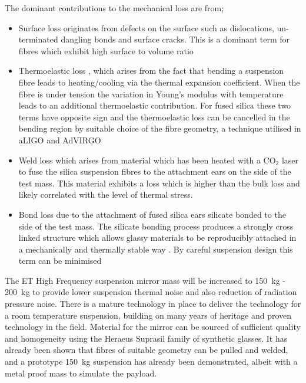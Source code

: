 The dominant contributions to the mechanical loss are from;
\begin{itemize}
\item Surface loss \cite{Gretarsson:1999, Penn:2006} originates from defects on the surface such as dislocations, un-terminated dangling bonds and surface cracks. This is a dominant term for fibres which exhibit high surface to volume ratio
\item Thermoelastic loss \cite{Cagnoli:2002}, which arises from the fact that bending a suspension fibre leads to heating/cooling via the thermal expansion coefficient. When the fibre is under tension the variation in Young's modulus with temperature leads to an additional thermoelastic contribution. For fused silica these two terms have opposite sign and the thermoelastic loss can be cancelled in the bending region by suitable choice of the fibre geometry, a technique utilised in aLIGO and AdVIRGO \cite{Bell:2013}
\item Weld loss which arises from material which has been heated with a $\textrm{CO}_{2}$ laser \cite{Cumming:2012} to fuse the silica suspension fibres to the attachment ears on the side of the test mass. This material exhibits a loss which is higher than the bulk loss \cite{Heptonstall:2010} and likely correlated with the level of thermal stress. 
\item Bond loss due to the attachment of fused silica ears silicate bonded to the side of the test mass. The silicate bonding process produces a strongly cross linked structure which allows glassy materials to be reproducibly attached in a mechanically and thermally stable way \cite{Rowan:1998}. By careful suspension design this term can be minimised
\end{itemize}

The ET High Frequency suspension mirror mass will be increased to 150~kg - 200~kg to provide lower suspension thermal noise and also reduction of radiation pressure noise. There is a mature technology in place to deliver the technology for a room temperature suspension, building on many years of heritage and proven technology in the field. Material for the mirror can be sourced of sufficient quality and homogeneity using the Heraeus Suprasil family of synthetic glasses. It has already been shown that fibres of suitable geometry can be pulled and welded, and a prototype 150~kg suspension has already been demonstrated, albeit with a metal proof mass to simulate the payload. 

